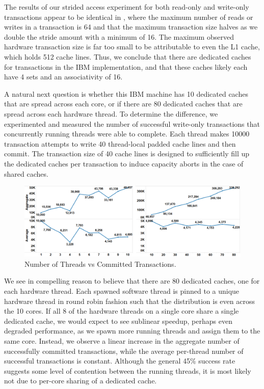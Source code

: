 The results of our strided access experiment for 
both read-only and write-only
transactions appear to be identical in
, where
the maximum number of reads or writes in a transaction
is 64 and that the maximum transaction size 
halves as we double the stride amount with a minimum
of 16.  The maximum observed hardware transaction size is far too
small to be attributable to even the {L1} cache, which holds 512 cache
lines.   Thus, we conclude that there are dedicated caches 
for transactions in the IBM implementation, and that
these caches likely each have 4 sets and an associativity of 16.

A natural next question is whether this IBM machine 
has 10 dedicated caches that
are spread across each core, or if there are 80 
dedicated caches that are spread
across each hardware thread. To determine the 
difference, we experimented and
measured the number of successful write-only 
transactions that concurrently
running threads were able to complete. Each 
thread makes 10000 transaction
attempts to write 40 thread-local padded cache 
lines and then commit. The
transaction size of 40 cache lines is designed 
to sufficiently fill up the
dedicated caches per transaction to induce capacity 
aborts in the case of shared
caches.

\begin{figure}[H]%
\centering
\includegraphics[width=\linewidth]{images/wttm_core_or_thread_ibm}
\caption{Number of Threads vs Committed Transactions. 
}
\label{fig:wttm_core_or_thread_ibm}
\end{figure}


We see in  compelling 
reason to believe that
there are 80 dedicated caches, one for each hardware 
thread. Each spawned
software thread is pinned to a unique hardware thread 
in round robin fashion
such that the distribution is even across the 10 cores. 
If all 8 of the
hardware threads on a single core share a single 
dedicated cache, we would
expect to see sublinear speedup, perhaps even degraded 
performance, as we spawn
more running threads and assign them to the same core. 
Instead, we observe a
linear increase in the aggregate number of successfully 
committed transactions,
while the average per-thread number of successful 
transactions is constant.
Although the general 45\% success rate suggests some 
level of contention between
the running threads, it is most likely not due to 
per-core sharing of a
dedicated cache.
 
